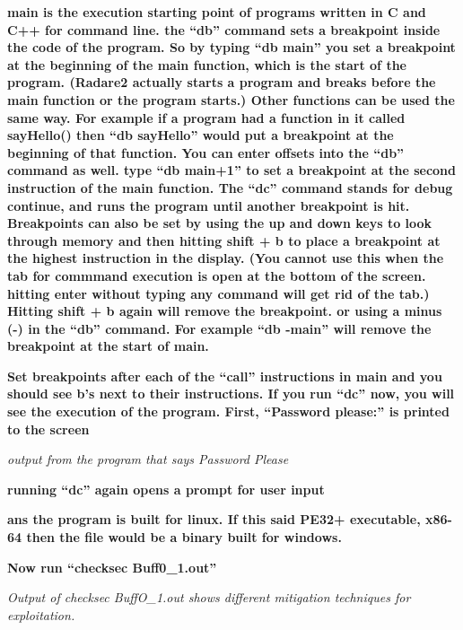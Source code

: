 \textbf{main is the execution starting point of programs written in C and C++ for command line. the ``db'' command sets
a breakpoint inside the code of the program. So by typing ``db main'' you set a breakpoint at the beginning of the main
function, which is the start of the program. (Radare2 actually starts a program and breaks before the main function or
the program starts.) Other functions can be used the same way. For example if a program had a function in it called
sayHello() then ``db sayHello'' would put a breakpoint at the beginning of that function. You can enter offsets into
the ``db'' command as well. type ``db main+1'' to set a breakpoint at the second instruction of the main function. The
``dc'' command stands for debug continue, and runs the program until another breakpoint is hit. Breakpoints can also be
set by using the up and down keys to look through memory and then hitting shift + b to place a breakpoint at the
highest instruction in the display. (You cannot use this when the tab for commmand execution is open at the bottom of
the screen. hitting enter without typing any command will get rid of the tab.) Hitting shift + b again will remove the
breakpoint. or using a minus (-) in the ``db'' command. For example ``db -main'' will remove the breakpoint at the
start of main.}

  
 

\textbf{Set breakpoints after each of the ``call'' instructions in main and you should see b's next to their
instructions. If you run ``dc'' now, you will see the execution of the program. First, ``Password please:'' is printed
to the screen}

  
 

\textit{output from the program that says Password Please}

\textbf{running ``dc'' again opens a prompt for user input}

\textbf{ans the program is built for linux. If this said PE32+ executable, x86-64 then the file would be a binary built
for windows.}

  
 

\textbf{Now run ``checksec Buff0\_1.out''}  
 

\textit{Output of checksec BuffO\_1.out shows different mitigation techniques for exploitation.}

